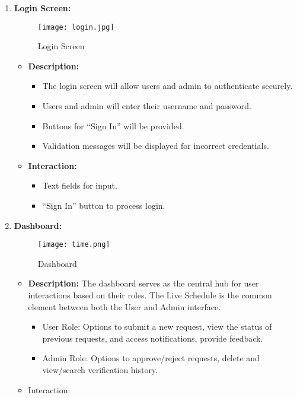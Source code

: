 \documentclass[a4paper,12pt]{article}
\begin{document}
\begin{enumerate} [label=\Roman*.]
    \item \textbf{Login Screen:} 
    \begin{figure}[h!]
    \centering
    \texttt{[image: login.jpg]} 
    \caption{Login Screen}
    \label{Fig 3.1.1 : Login Screen}
\end{figure}
    \begin{itemize}
        \item \textbf{Description:}
        \begin{itemize}
            \item The login screen will allow users and admin to authenticate securely.
            \item Users and admin will enter their username and password.
            \item Buttons for “Sign In” will be provided.
            \item Validation messages will be displayed for incorrect credentials.
        \end{itemize}
        \item \textbf{Interaction:}
        \begin{itemize}
            \item Text fields for input.
            \item “Sign In” button to process login.
        \end{itemize}
    \end{itemize}
    \clearpage
   
    \item \textbf{Dashboard:}
     \begin{figure}[h!]
    \centering
    \texttt{[image: time.png]} 
    \caption{Dashboard}
    \label{dashboard}
    \end{figure}
    
    \begin{itemize}
        \item \textbf{Description:}
        The dashboard serves as the central hub for user interactions based on their roles.
The Live Schedule is the common element between both the User and Admin interface.
        
        \begin{itemize}
            \item User Role: Options to submit a new request, view the status of previous requests, and access notifications, provide feedback.
            \item Admin Role: Options to approve/reject requests, delete and view/search verification history.
        \end{itemize}
        \item Interaction:
        \begin{itemize}


\end{itemize}
\end{itemize}
\end{enumerate}
\end{document}
